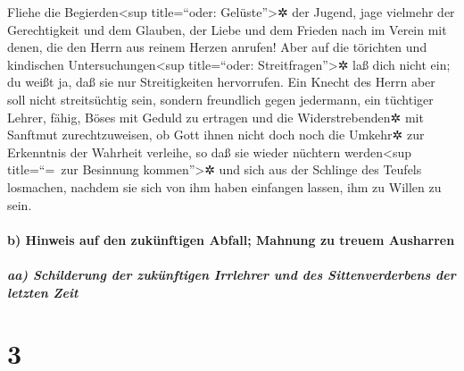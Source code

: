  Fliehe die Begierden\textless sup title=``oder:
Gelüste''\textgreater✲ der Jugend, jage vielmehr der Gerechtigkeit und
dem Glauben, der Liebe und dem Frieden nach im Verein mit denen, die den
Herrn aus reinem Herzen anrufen!  Aber auf die törichten
und kindischen Untersuchungen\textless sup title=``oder:
Streitfragen''\textgreater✲ laß dich nicht ein; du weißt ja, daß sie nur
Streitigkeiten hervorrufen.  Ein Knecht des Herrn aber
soll nicht streitsüchtig sein, sondern freundlich gegen jedermann, ein
tüchtiger Lehrer, fähig, Böses mit Geduld zu ertragen 
und die Widerstrebenden✲ mit Sanftmut zurechtzuweisen, ob Gott ihnen
nicht doch noch die Umkehr✲ zur Erkenntnis der Wahrheit verleihe,
 so daß sie wieder nüchtern werden\textless sup
title=``=~zur Besinnung kommen''\textgreater✲ und sich aus der Schlinge
des Teufels losmachen, nachdem sie sich von ihm haben einfangen lassen,
ihm zu Willen zu sein.

\hypertarget{b-hinweis-auf-den-zukuxfcnftigen-abfall-mahnung-zu-treuem-ausharren}{%
\paragraph{b) Hinweis auf den zukünftigen Abfall; Mahnung zu treuem
Ausharren}\label{b-hinweis-auf-den-zukuxfcnftigen-abfall-mahnung-zu-treuem-ausharren}}

\hypertarget{aa-schilderung-der-zukuxfcnftigen-irrlehrer-und-des-sittenverderbens-der-letzten-zeit}{%
\subparagraph{aa) Schilderung der zukünftigen Irrlehrer und des
Sittenverderbens der letzten
Zeit}\label{aa-schilderung-der-zukuxfcnftigen-irrlehrer-und-des-sittenverderbens-der-letzten-zeit}}

\hypertarget{section-2}{%
\section{3}\label{section-2}}

